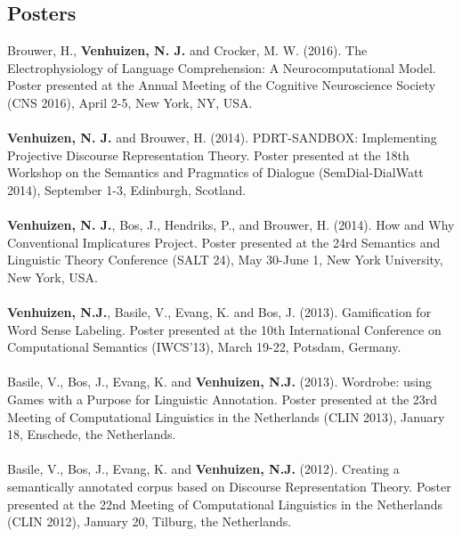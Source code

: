 \documentclass[a4paper,10pt]{article}
\begin{document}
\subsection*{Posters}

\noindent
    Brouwer, H., \textbf{Venhuizen, N. J.} and Crocker, M. W. (2016). The
    Electrophysiology of Language Comprehension: A Neurocomputational Model.
    Poster presented at the Annual Meeting of the Cognitive Neuroscience
    Society (CNS 2016), April 2-5, New York, NY, USA.\\
    \\
    \textbf{Venhuizen, N. J.} and Brouwer, H. (2014). PDRT-SANDBOX:
    Implementing Projective Discourse Representation Theory. Poster
    presented at the 18th Workshop on the Semantics and Pragmatics of
    Dialogue (SemDial-DialWatt 2014), September 1-3, Edinburgh, Scotland.\\
    \\
    \textbf{Venhuizen, N. J.}, Bos, J., Hendriks, P., and Brouwer, H.
    (2014). How and Why Conventional Implicatures Project. Poster presented
    at the 24rd Semantics and Linguistic Theory Conference (SALT 24), May
    30-June 1, New York University, New York, USA.\\
    \\
    \textbf{Venhuizen, N.J.}, Basile, V., Evang, K. and Bos, J. (2013).
    Gamification for Word Sense Labeling. Poster presented at the 10th
    International Conference on Computational Semantics (IWCS'13), March
    19-22, Potsdam, Germany.\\
    \\
    Basile, V., Bos, J., Evang, K. and \textbf{Venhuizen, N.J.} (2013).
    Wordrobe: using Games with a Purpose for Linguistic Annotation. Poster
    presented at the 23rd Meeting of Computational Linguistics in the
    Netherlands (CLIN 2013), January 18, Enschede, the Netherlands.\\
    \\
    Basile, V., Bos, J., Evang, K. and \textbf{Venhuizen, N.J.} (2012).
    Creating a semantically annotated corpus based on Discourse
    Representation Theory. Poster presented at the 22nd Meeting of
    Computational Linguistics in the Netherlands (CLIN 2012), January 20,
    Tilburg, the Netherlands.


\end{document}
